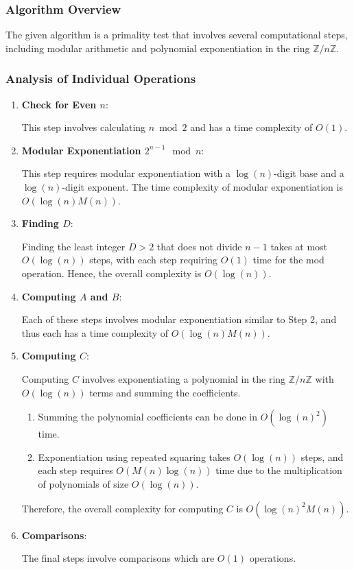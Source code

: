 \documentclass{article}
\theoremstyle{plain}
\theoremstyle{definition}
\begin{document}
\subsubsection{Algorithm Overview}
The given algorithm is a primality test that involves several computational steps, including modular arithmetic and polynomial exponentiation in the ring \(\mathbb{Z}/n\mathbb{Z}\).

\subsubsection{Analysis of Individual Operations}
\begin{enumerate}
    \item \textbf{Check for Even \( n \)}:
    
        This step involves calculating $n \bmod{2}$ and has a time complexity of \( O(1) \).

    \item \textbf{Modular Exponentiation \( 2^{n-1} \mod n \)}:
    
        This step requires modular exponentiation with a \( \log(n) \)-digit base and a \( \log(n) \)-digit exponent. The time complexity of modular exponentiation is \( O(\log(n) M(n)) \).

    \item \textbf{Finding \( D \)}:
    
        Finding the least integer \( D > 2 \) that does not divide \( n-1 \) takes at most \( O(\log(n)) \) steps, with each step requiring \( O(1) \) time for the mod operation. Hence, the overall complexity is \( O(\log(n)) \).

    \item \textbf{Computing \( A \) and \( B \)}:
    
        Each of these steps involves modular exponentiation similar to Step 2, and thus each has a time complexity of \( O(\log(n) M(n)) \).

    \item \textbf{Computing \( C \)}:
    
        Computing \( C \) involves exponentiating a polynomial in the ring \(\mathbb{Z}/n\mathbb{Z}\) with \( O(\log(n)) \) terms and summing the coefficients.
        \begin{enumerate}
            \item Summing the polynomial coefficients can be done in \( O(\log(n)^2) \) time.
            \item Exponentiation using repeated squaring takes \( O(\log(n)) \) steps, and each step requires \( O(M(n)\log(n)) \) time due to the multiplication of polynomials of size \( O(\log(n)) \).
        \end{enumerate}
         Therefore, the overall complexity for computing \( C \) is \( O(\log(n)^2 M(n)) \).

    \item \textbf{Comparisons}:
    
        The final steps involve comparisons which are \( O(1) \) operations.
\end{enumerate}
\end{document}
